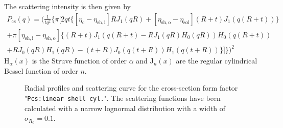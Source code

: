 The scattering intensity is then given by
\begin{multline}\label{eq:Pcs_cyl_linsh}
 P_\mathrm{cs}(q)= \Bigg( \frac{1}{t q^2}
\bigg\{ \pi \Big[ 2qt \big\{\left[\eta_\mathrm{c}   -\eta_\mathrm{sh,i}\right] R     J_1(qR) +  \left[\eta_\mathrm{sh,o}-\eta_\mathrm{sol}\right] (R+t) J_1\left(q(R+t)\right)\big\} \\
   + \pi\left[\eta_\mathrm{sh,i} - \eta_\mathrm{sh,o}\right]\big\{(R+t) J_1(q(R+t)-R J_1(qR) H_0(qR)) H_0\left(q(R+t)\right)  \\
        +  R      J_0(qR)     H_1(qR) - (t+R)   J_0(q(t+R)) H_1\left(q(t+R)\right)\big\}\Big]\bigg\} \Bigg)^2
\end{multline}
$\mathrm{H}_\alpha(x)$ is the Struve function of order $\alpha$ and $\mathrm{J}_n(x)$ are the regular cylindrical Bessel function of order $n$.


\begin{figure}[htb]
\captionsetup[subfigure]{position=b}
\centering
{}
\hfill
{}
\caption{Radial profiles and scattering curve for the cross-section form factor "\texttt{Pcs:linear shell cyl.}". The scattering functions have been calculated with a narrow lognormal distribution with a width of $\sigma_{R_0}=0.1$.}
\label{fig:Pcs:cyl_fuzzy}
\end{figure}


